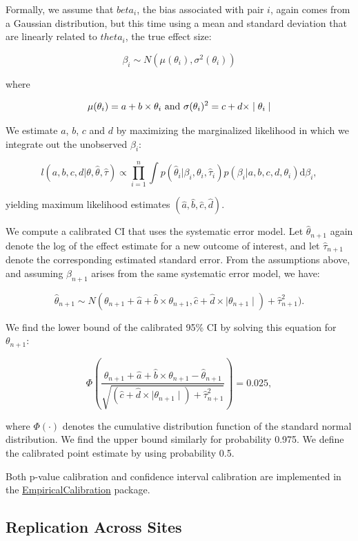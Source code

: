 \documentclass[11pt]{book}
\theoremstyle{definition}
\theoremstyle{definition}
\theoremstyle{definition}
\theoremstyle{remark}
\begin{document}
Formally, we assume that \(beta_i\), the bias associated with pair
\(i\), again comes from a Gaussian distribution, but this time using a
mean and standard deviation that are linearly related to \(theta_i\),
the true effect size:

\[\beta_i \sim N(\mu(\theta_i) , \sigma^2(\theta_i))\]

where

\[\mu(\theta_i) = a + b \times \theta_i \text{ and } \\
  \sigma(\theta_i) ^2= c + d \times \mid \theta_i \mid\]

We estimate \(a\), \(b\), \(c\) and \(d\) by maximizing the marginalized
likelihood in which we integrate out the unobserved \(\beta_i\):

\[l(a,b,c,d | \theta, \hat{\theta}, \hat{\tau} ) \propto \prod_{i=1}^{n}\int p(\hat{\theta}_i|\beta_i, \theta_i, \hat{\tau}_i)p(\beta_i|a,b,c,d,\theta_i) \text{d}\beta_i ,\]

yielding maximum likelihood estimates
\((\hat{a}, \hat{b}, \hat{c}, \hat{d})\).

We compute a calibrated CI that uses the systematic error model. Let
\(\hat{\theta}_{n+1}\) again denote the log of the effect estimate for a
new outcome of interest, and let \(\hat{\tau}_{n+1}\) denote the
corresponding estimated standard error. From the assumptions above, and
assuming \(\beta_{n+1}\) arises from the same systematic error model, we
have:

\[\hat{\theta}_{n+1} \sim N(
\theta_{n+1} + \hat{a} + \hat{b} \times \theta_{n+1},
\hat{c} + \hat{d} \times \mid \theta_{n+1} \mid) + \hat{\tau}_{n+1}^2) .\]

We find the lower bound of the calibrated 95\% CI by solving this
equation for \(\theta_{n+1}\):

\[\Phi\left(
\frac{\theta_{n+1} + \hat{a} + \hat{b} \times \theta_{n+1}-\hat{\theta}_{n+1}}
{\sqrt{(\hat{c} + \hat{d} \times \mid \theta_{n+1} \mid) + \hat{\tau}_{n+1}^2}}
\right) = 0.025 ,\]

where \(\Phi(\cdot)\) denotes the cumulative distribution function of
the standard normal distribution. We find the upper bound similarly for
probability 0.975. We define the calibrated point estimate by using
probability 0.5.

Both p-value calibration and confidence interval calibration are
implemented in the
\href{https://ohdsi.github.io/EmpiricalCalibration/}{EmpiricalCalibration}
package.

\subsection{Replication Across Sites}\label{replication-across-sites}
\end{document}
